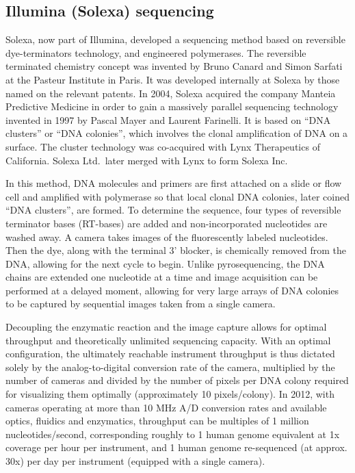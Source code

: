 \hypertarget{illumina-solexa-sequencing}{%
\subsection{Illumina (Solexa) sequencing}\label{illumina-solexa-sequencing}}

Solexa, now part of Illumina, developed a sequencing method based on reversible dye-terminators technology, and engineered polymerases. The reversible terminated chemistry concept was invented by Bruno Canard and Simon Sarfati at the Pasteur Institute in Paris. It was developed internally at Solexa by those named on the relevant patents. In 2004, Solexa acquired the company Manteia Predictive Medicine in order to gain a massively parallel sequencing technology invented in 1997 by Pascal Mayer and Laurent Farinelli. It is based on ``DNA clusters'' or ``DNA colonies'', which involves the clonal amplification of DNA on a surface. The cluster technology was co-acquired with Lynx Therapeutics of California. Solexa Ltd.~later merged with Lynx to form Solexa Inc.

In this method, DNA molecules and primers are first attached on a slide or flow cell and amplified with polymerase so that local clonal DNA colonies, later coined ``DNA clusters'', are formed. To determine the sequence, four types of reversible terminator bases (RT-bases) are added and non-incorporated nucleotides are washed away. A camera takes images of the fluorescently labeled nucleotides. Then the dye, along with the terminal 3' blocker, is chemically removed from the DNA, allowing for the next cycle to begin. Unlike pyrosequencing, the DNA chains are extended one nucleotide at a time and image acquisition can be performed at a delayed moment, allowing for very large arrays of DNA colonies to be captured by sequential images taken from a single camera.

Decoupling the enzymatic reaction and the image capture allows for optimal throughput and theoretically unlimited sequencing capacity. With an optimal configuration, the ultimately reachable instrument throughput is thus dictated solely by the analog-to-digital conversion rate of the camera, multiplied by the number of cameras and divided by the number of pixels per DNA colony required for visualizing them optimally (approximately 10 pixels/colony). In 2012, with cameras operating at more than 10 MHz A/D conversion rates and available optics, fluidics and enzymatics, throughput can be multiples of 1 million nucleotides/second, corresponding roughly to 1 human genome equivalent at 1x coverage per hour per instrument, and 1 human genome re-sequenced (at approx. 30x) per day per instrument (equipped with a single camera).

